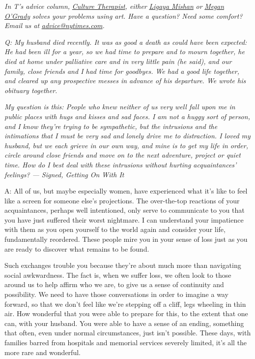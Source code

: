 \emph{In T's advice column,}
\href{https://www.nytimes.com/column/culture-therapist?module=inline}{\emph{Culture
Therapist}}\emph{, either}
\href{https://www.nytimes.com/by/ligaya-mishan?module=inline}{\emph{Ligaya
Mishan}} \emph{or}
\href{https://www.nytimes.com/by/megan-o-grady?module=inline}{\emph{Megan
O'Grady}} \emph{solves your problems using art. Have a question? Need
some comfort? Email us at}
\href{mailto:advice@nytimes.com}{\emph{advice@nytimes.com}}\emph{.}

\emph{Q: My husband died recently. It was as good a death as could have
been expected: He had been ill for a year, so we had time to prepare and
to mourn together, he died at home under palliative care and in very
little pain (he said), and our family, close friends and I had time for
goodbyes. We had a good life together, and cleared up any prospective
messes in advance of his departure. We wrote his obituary together.}

\emph{My question is this: People who knew neither of us very well fall
upon me in public places with hugs and kisses and sad faces. I am not a
huggy sort of person, and I know they're trying to be sympathetic, but
the intrusions and the intimations that I must be very sad and lonely
drive me to distraction. I loved my husband, but we each grieve in our
own way, and mine is to get my life in order, circle around close
friends and move on to the next adventure, project or quiet time. How do
I best deal with these intrusions without hurting acquaintances'
feelings? --- Signed, Getting On With It}

A: All of us, but maybe especially women, have experienced what it's
like to feel like a screen for someone else's projections. The
over-the-top reactions of your acquaintances, perhaps well intentioned,
only serve to communicate to you that you have just suffered their worst
nightmare. I can understand your impatience with them as you open
yourself to the world again and consider your life, fundamentally
reordered. These people mire you in your sense of loss just as you are
ready to discover what remains to be found.

Such exchanges trouble you because they're about much more than
navigating social awkwardness. The fact is, when we suffer loss, we
often look to those around us to help affirm who we are, to give us a
sense of continuity and possibility. We need to have those conversations
in order to imagine a way forward, so that we don't feel like we're
stepping off a cliff, legs wheeling in thin air. How wonderful that you
were able to prepare for this, to the extent that one can, with your
husband. You were able to have a sense of an ending, something that
often, even under normal circumstances, just isn't possible. These days,
with families barred from hospitals and memorial services severely
limited, it's all the more rare and wonderful.

